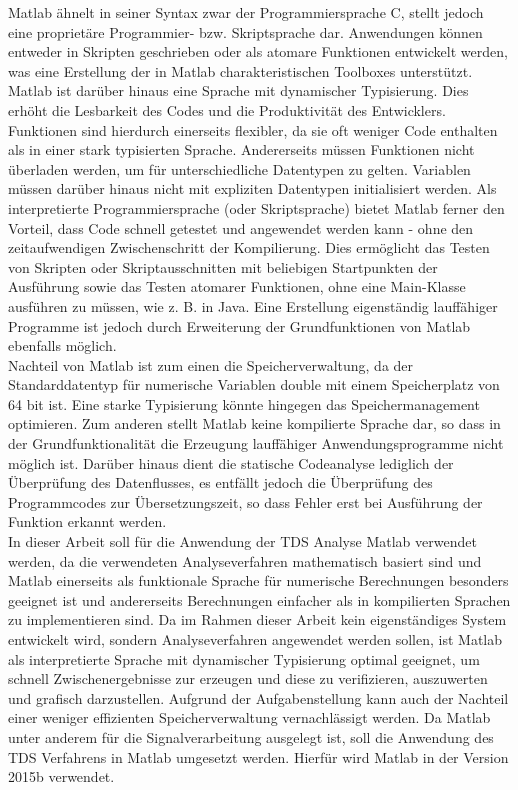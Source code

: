 Matlab ähnelt in seiner Syntax zwar der Programmiersprache C, stellt jedoch eine proprietäre Programmier- bzw. Skriptsprache dar. Anwendungen können entweder in Skripten geschrieben oder als atomare Funktionen entwickelt werden, was eine Erstellung der in Matlab charakteristischen Toolboxes unterstützt. Matlab ist darüber hinaus eine Sprache mit dynamischer Typisierung. Dies erhöht die Lesbarkeit des Codes und die Produktivität des Entwicklers. Funktionen sind hierdurch einerseits flexibler, da sie oft weniger Code enthalten als in einer stark typisierten Sprache. Andererseits müssen Funktionen nicht überladen werden, um für unterschiedliche Datentypen zu gelten. Variablen müssen darüber hinaus nicht mit expliziten Datentypen initialisiert werden. Als interpretierte Programmiersprache (oder Skriptsprache) bietet Matlab ferner den Vorteil, dass Code schnell getestet und angewendet werden kann - ohne den zeitaufwendigen Zwischenschritt der Kompilierung. Dies ermöglicht das Testen von Skripten oder Skriptausschnitten mit beliebigen Startpunkten der Ausführung sowie das Testen atomarer Funktionen, ohne eine Main-Klasse ausführen zu müssen, wie z. B. in Java. Eine Erstellung eigenständig lauffähiger Programme ist jedoch durch Erweiterung der Grundfunktionen von Matlab ebenfalls möglich. \parencite{stein_programmieren_2012}\\

Nachteil von Matlab ist zum einen die Speicherverwaltung, da der Standarddatentyp für numerische Variablen double mit einem Speicherplatz von 64 bit ist. Eine starke Typisierung könnte hingegen das Speichermanagement optimieren. Zum anderen stellt Matlab keine kompilierte Sprache dar, so dass in der Grundfunktionalität die Erzeugung lauffähiger Anwendungsprogramme nicht möglich ist. Darüber hinaus dient die statische Codeanalyse lediglich der Überprüfung des Datenflusses, es entfällt jedoch die Überprüfung des Programmcodes zur Übersetzungszeit, so dass Fehler erst bei Ausführung der Funktion erkannt werden.\\

In dieser Arbeit soll für die Anwendung der \acs{TDS} Analyse Matlab verwendet werden, da die verwendeten Analyseverfahren mathematisch basiert sind und Matlab einerseits als funktionale Sprache für numerische Berechnungen besonders geeignet ist und andererseits Berechnungen einfacher als in kompilierten Sprachen zu implementieren sind. Da im Rahmen dieser Arbeit kein eigenständiges System entwickelt wird, sondern Analyseverfahren angewendet werden sollen, ist Matlab als interpretierte Sprache mit dynamischer Typisierung optimal geeignet, um schnell Zwischenergebnisse zur erzeugen und diese zu verifizieren, auszuwerten und grafisch darzustellen. Aufgrund der Aufgabenstellung kann auch der Nachteil einer weniger effizienten Speicherverwaltung vernachlässigt werden.   Da Matlab unter anderem für die Signalverarbeitung ausgelegt ist, soll die Anwendung des \acs{TDS} Verfahrens in Matlab umgesetzt werden. Hierfür wird  Matlab in der Version 2015b verwendet.

